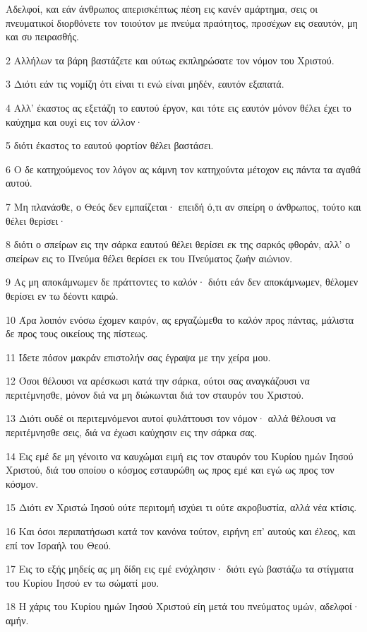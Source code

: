 \par Αδελφοί, και εάν άνθρωπος απερισκέπτως πέση εις κανέν αμάρτημα, σεις οι πνευματικοί διορθόνετε τον τοιούτον με πνεύμα πραότητος, προσέχων εις σεαυτόν, μη και συ πειρασθής.
\par 2 Αλλήλων τα βάρη βαστάζετε και ούτως εκπληρώσατε τον νόμον του Χριστού.
\par 3 Διότι εάν τις νομίζη ότι είναι τι ενώ είναι μηδέν, εαυτόν εξαπατά.
\par 4 Αλλ' έκαστος ας εξετάζη το εαυτού έργον, και τότε εις εαυτόν μόνον θέλει έχει το καύχημα και ουχί εις τον άλλον·
\par 5 διότι έκαστος το εαυτού φορτίον θέλει βαστάσει.
\par 6 Ο δε κατηχούμενος τον λόγον ας κάμνη τον κατηχούντα μέτοχον εις πάντα τα αγαθά αυτού.
\par 7 Μη πλανάσθε, ο Θεός δεν εμπαίζεται· επειδή ό,τι αν σπείρη ο άνθρωπος, τούτο και θέλει θερίσει·
\par 8 διότι ο σπείρων εις την σάρκα εαυτού θέλει θερίσει εκ της σαρκός φθοράν, αλλ' ο σπείρων εις το Πνεύμα θέλει θερίσει εκ του Πνεύματος ζωήν αιώνιον.
\par 9 Ας μη αποκάμνωμεν δε πράττοντες το καλόν· διότι εάν δεν αποκάμνωμεν, θέλομεν θερίσει εν τω δέοντι καιρώ.
\par 10 Άρα λοιπόν ενόσω έχομεν καιρόν, ας εργαζώμεθα το καλόν προς πάντας, μάλιστα δε προς τους οικείους της πίστεως.
\par 11 Ίδετε πόσον μακράν επιστολήν σας έγραψα με την χείρα μου.
\par 12 Όσοι θέλουσι να αρέσκωσι κατά την σάρκα, ούτοι σας αναγκάζουσι να περιτέμνησθε, μόνον διά να μη διώκωνται διά τον σταυρόν του Χριστού.
\par 13 Διότι ουδέ οι περιτεμνόμενοι αυτοί φυλάττουσι τον νόμον· αλλά θέλουσι να περιτέμνησθε σεις, διά να έχωσι καύχησιν εις την σάρκα σας.
\par 14 Εις εμέ δε μη γένοιτο να καυχώμαι ειμή εις τον σταυρόν του Κυρίου ημών Ιησού Χριστού, διά του οποίου ο κόσμος εσταυρώθη ως προς εμέ και εγώ ως προς τον κόσμον.
\par 15 Διότι εν Χριστώ Ιησού ούτε περιτομή ισχύει τι ούτε ακροβυστία, αλλά νέα κτίσις.
\par 16 Και όσοι περιπατήσωσι κατά τον κανόνα τούτον, ειρήνη επ' αυτούς και έλεος, και επί τον Ισραήλ του Θεού.
\par 17 Εις το εξής μηδείς ας μη δίδη εις εμέ ενόχλησιν· διότι εγώ βαστάζω τα στίγματα του Κυρίου Ιησού εν τω σώματί μου.
\par 18 Η χάρις του Κυρίου ημών Ιησού Χριστού είη μετά του πνεύματος υμών, αδελφοί· αμήν.


